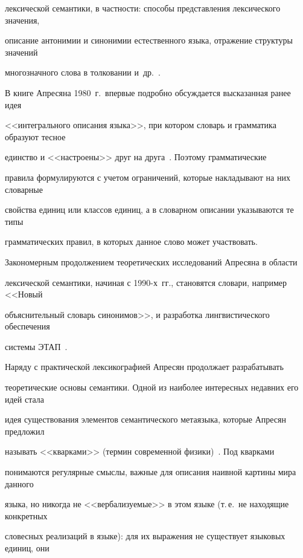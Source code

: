 лексической семантики, в частности: способы представления лексического значения, 


описание антонимии и синонимии естественного языка, отражение структуры значений 


многозначного слова в толковании и~др.~\cite{16-2-11}.


   


   В книге Апресяна 1980~г.\ впервые подробно обсуждается высказанная ранее идея 


<<интегрального описания языка>>, при котором словарь и грамматика образуют тесное 


единство и <<настроены>> друг на друга~\cite{17-2-11}. Поэтому грамматические 


правила формулируются с учетом ограничений, которые накладывают на них словарные 


свойства единиц или классов единиц, а в словарном описании указываются те типы 


грамматических правил, в которых данное слово может участвовать. 


   


   Закономерным продолжением теоретических исследований Апресяна в об\-ласти 


лексической семантики, начиная с 1990-х~гг., становятся словари, например <<Новый 


объяснительный словарь синонимов>>, и разработка лингвистического обеспечения 


системы ЭТАП~\cite{18-2-11, 19-2-11}.


   


   Наряду с практической лексикографией Апресян продолжает разрабатывать 


теоретические основы семантики. Одной из наиболее интересных недавних его идей стала 


идея существования элементов семантического метаязыка, которые Апресян предложил 


называть <<кварками>> (термин современной физики)~\cite{20-2-11}. Под кварками 


понимаются регулярные смыслы, важные для описания наивной картины мира данного 


языка, но никогда не <<вербализуемые>> в этом языке (т.\,е.\ не находящие конкретных 


словесных реализаций в языке): для их выражения не существует языковых единиц, они 


